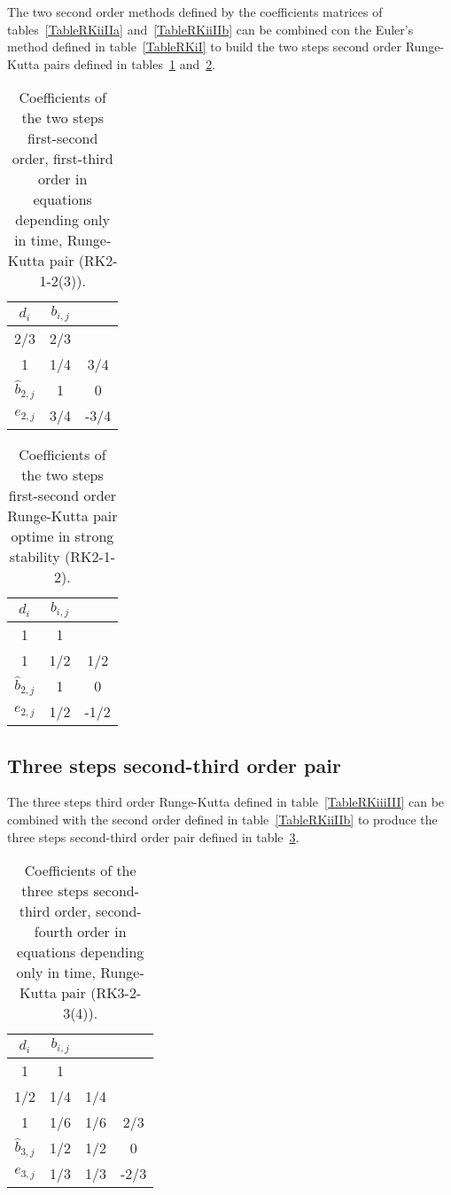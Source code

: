 \documentclass[a4paper]{article}
\begin{document}
The two second order methods defined by the coefficients matrices of
tables~\ref{TableRKiiIIa} and~\ref{TableRKiiIIb} can be combined con the
Euler's method defined in table~\ref{TableRKiI} to build the two steps second
order Runge-Kutta pairs defined in tables~\ref{TableRKIiiIIa}
and~\ref{TableRKIiiIIb}.
\begin{table}[ht]
	\centering
	\begin{tabular}{c|cc}
		$d_{i}$ & $b_{i,j}$ \\ \hline
		2/3 & 2/3 \\
		1 & 1/4 & 3/4 \\ \hline
		$\hat{b}_{2,j}$ & 1 & 0 \\ \hline
		$e_{2,j}$ & 3/4 & -3/4
	\end{tabular}
	\caption{Coefficients of the two steps first-second order, first-third order
		in equations depending only in time, Runge-Kutta pair (RK2-1-2(3)).
		\label{TableRKIiiIIa}}
\end{table}
\begin{table}[ht]
	\centering
	\begin{tabular}{c|cc}
		$d_{i}$ & $b_{i,j}$ \\ \hline
		1 & 1 \\
		1 & 1/2 & 1/2 \\ \hline
		$\hat{b}_{2,j}$ & 1 & 0 \\ \hline
		$e_{2,j}$ & 1/2 & -1/2
	\end{tabular}
	\caption{Coefficients of the two steps first-second order Runge-Kutta pair
		optime in strong stability (RK2-1-2).\label{TableRKIiiIIb}}
\end{table}

\subsection{Three steps second-third order pair}

The three steps third order Runge-Kutta defined in table~\ref{TableRKiiiIII}
can be combined with the second order defined in table~\ref{TableRKiiIIb} to
produce the three steps second-third order pair defined in
table~\ref{TableRKIIiiiIII}.
\begin{table}[ht]
	\centering
	\begin{tabular}{c|ccc}
		$d_{i}$ & $b_{i,j}$ \\ \hline
		1 & 1 \\
		1/2 & 1/4 & 1/4 \\
		1 & 1/6 & 1/6 & 2/3 \\ \hline
		$\hat{b}_{3,j}$ & 1/2 & 1/2 & 0 \\ \hline
		$e_{3,j}$ & 1/3 & 1/3 & -2/3
	\end{tabular}
	\caption{Coefficients of the three steps second-third order, second-fourth
		order in equations depending only in time, Runge-Kutta pair (RK3-2-3(4)).
		\label{TableRKIIiiiIII}}
\end{table}
\end{document}
